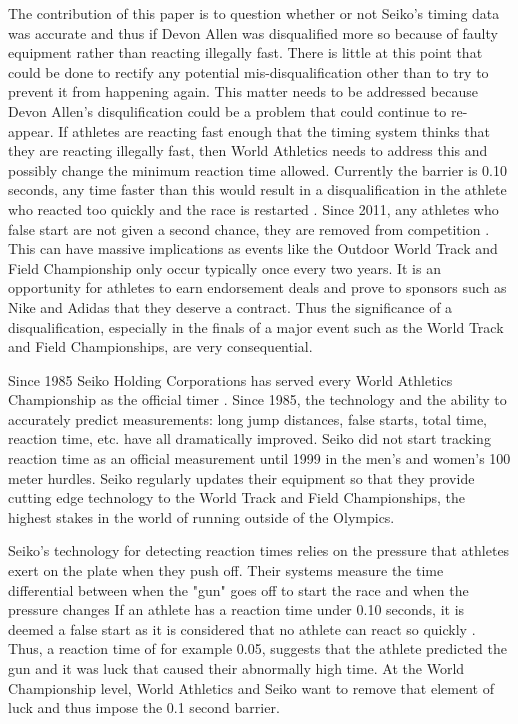 \documentclass[12pt, letterpaper, titlepage]{article}
\begin{document}
The contribution of this paper is to question whether or not Seiko's timing data
was accurate and thus if Devon Allen was disqualified more so because of faulty
equipment rather than reacting illegally fast.  There is little at this point
that could be done to rectify any potential mis-disqualification other than to try
to prevent it from happening again.  This matter needs to be addressed because Devon Allen's 
disqulification could be a problem that could continue to re-appear.  If athletes
are reacting fast enough that the timing system thinks that they are reacting
illegally fast, then World Athletics needs to address this and possibly change
the minimum reaction time allowed.  Currently the barrier is 0.10 seconds, any time
faster than this would result in a disqualification in the athlete who reacted too
quickly and the race is restarted \citep{Seiko-Timing}.  Since 2011, any athletes who false 
start are not given a second chance, they are removed from competition \citep{False-Start}.  
This can have massive implications as events like the Outdoor World Track and Field Championship 
only occur typically once every two years.  It is an opportunity for athletes to earn endorsement
deals and prove to sponsors such as Nike and Adidas that
they deserve a contract.  Thus the significance of a disqualification, especially in the finals 
of a major event such as the World Track and Field Championships, are very
consequential.  


Since 1985 Seiko Holding Corporations has served every World Athletics Championship
as the official timer \citep{Seiko}.  Since 1985, the technology and the ability
to accurately predict measurements: long jump distances, false starts, total time,
reaction time, etc. have all dramatically improved.  Seiko did not start tracking
reaction time as an official measurement until 1999 in the men's and women's 100 meter
hurdles.  Seiko regularly updates their equipment so that they provide cutting edge
technology to the World Track and Field Championships, the highest stakes in the world
of running outside of the Olympics.

Seiko's technology for detecting reaction times relies on the pressure that athletes
exert on the plate when they push off.  Their systems measure the time differential
between when the "gun" goes off to start the race and when the pressure changes 
\citep{Seiko}  If an athlete has a reaction time under 0.10 seconds, it is deemed a 
false start as it is considered that no athlete can react so quickly \citep{Seiko-Timing}.  
Thus, a reaction time of for example 0.05, suggests that the athlete predicted the gun and it
was luck that caused their abnormally high time.  At the World Championship level,
World Athletics and Seiko want to remove that element of luck and thus impose the 0.1
second barrier.
\end{document}
